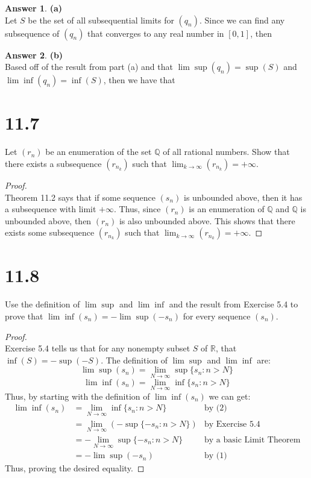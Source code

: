 \documentclass[10pt,a4paper]{article}
\theoremstyle{definition}
\newtheorem*{answer*}{Answer}
\begin{document}
\begin{answer*}{\textbf{(a)}}
\\Let $S$ be the set of all subsequential limits for $(q_n)$. Since we can find any subsequence of $(q_n)$ that converges to any real number in $[0,1]$, then 
\end{answer*}

\begin{answer*}{\textbf{(b)}}
\\Based off of the result from part (a) and that $\lim \sup (q_n) = \sup(S)$ and $\lim \inf (q_n) = \inf(S)$, then we have that 
\end{answer*}
\section*{11.7}
Let $(r_n)$ be an enumeration of the set $\mathbb{Q}$ of all rational numbers. Show that there exists a subsequence $(r_{n_k})$ such that $\lim_{k \to \infty}(r_{n_k}) = +\infty$. 

\begin{proof}{$ $}
\\Theorem 11.2 says that if some sequence $(s_n)$ is unbounded above, then it has a subsequence with limit $+\infty$. Thus, since $(r_n)$ is an enumeration of $\mathbb{Q}$ and $\mathbb{Q}$ is unbounded above, then $(r_n)$ is also unbounded above. This shows that there exists some subsequence $(r_{n_k})$ such that $\lim_{k \to \infty}(r_{n_k}) = +\infty$.
\end{proof}

\section*{11.8}
Use the definition of $\lim \sup$ and $\lim \inf$ and the result from Exercise 5.4 to prove that $\lim \inf(s_n) = -\lim \sup (-s_n)$ for every sequence $(s_n)$. 

\begin{proof}{$ $}
\\Exercise 5.4 tells us that for any nonempty subset $S$ of $\mathbb{R}$, that $\inf(S) = -\sup(-S)$. The definition of $\lim \sup$ and $\lim \inf$ are:
\begin{equation}
\lim \sup (s_n) = \lim_{N \to \infty} \sup\{s_n : n > N\}
\end{equation}
\begin{equation}
\lim \inf (s_n) = \lim_{N \to \infty} \inf\{s_n : n > N\}
\end{equation}
Thus, by starting with the definition of $\lim \inf(s_n)$ we can get:
\begin{align*}
\lim \inf (s_n) &= \lim_{N \to \infty} \inf\{s_n : n > N\} &\text{by (2)}\\
&= \lim_{N \to \infty} (-\sup\{-s_n : n > N\}) &\text{by Exercise 5.4}\\
&= - \lim_{N \to \infty} \sup\{-s_n : n > N\} &\text{by a basic Limit Theorem}\\
&= -\lim \sup(-s_n) &\text{by (1)}
\end{align*}
Thus, proving the desired equality.
\end{proof}
\end{document}
